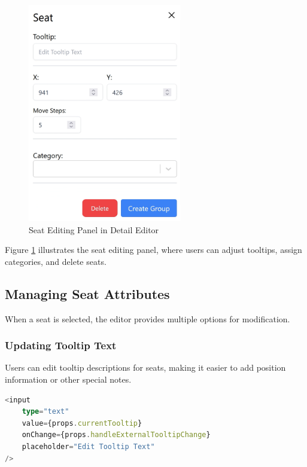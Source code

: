 \begin{figure}[H]
    \centering
    \includegraphics[width=0.6\textwidth]{pics/DetailEditorSeat.png}
    \caption{Seat Editing Panel in Detail Editor}
    \label{fig:detail-editor-seat}
\end{figure}

Figure \ref{fig:detail-editor-seat} illustrates the seat editing panel, where users can adjust tooltips, assign categories, and delete seats.

\subsection{Managing Seat Attributes}
When a seat is selected, the editor provides multiple options for modification.

\subsubsection{Updating Tooltip Text}
Users can edit tooltip descriptions for seats, making it easier to add position information or other special notes.

\begin{lstlisting}[language=TypeScript, caption=Updating Tooltip for Selected Seats, label=lst:update-tooltip]
<input
    type="text"
    value={props.currentTooltip}
    onChange={props.handleExternalTooltipChange}
    placeholder="Edit Tooltip Text"
/>
\end{lstlisting}

